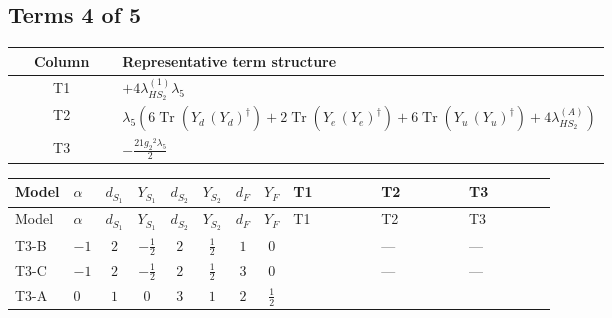 \documentclass[8pt]{article}
\begin{document}
\begin{landscape}
\subsection*{Terms 4 of 5}
\begin{center}
\begin{tabular}{@{}c >{\raggedright\arraybackslash}p{0.82\linewidth}@{}}
\toprule
Column & Representative term structure \\
\midrule
T1 & \(\displaystyle +4 {\lambda_{HS_2}^{(1)}} {\lambda_5}\) \\
\midrule
T2 & \(\displaystyle {\lambda_5} (6 \operatorname{Tr}\!\left({Y_d}\,\left({Y_d}\right)^{\dagger}\right)+2 \operatorname{Tr}\!\left({Y_e}\,\left({Y_e}\right)^{\dagger}\right)+6 \operatorname{Tr}\!\left({Y_u}\,\left({Y_u}\right)^{\dagger}\right)+4 {\lambda_{HS_2}^{(A)}})\) \\
\midrule
T3 & \(\displaystyle -\frac{21 {g_2}^2 {\lambda_5}}{2}\) \\
\midrule
\bottomrule
\end{tabular}
\end{center}
\smallskip
\tiny
\begin{longtable}{@{}llcccccc >{\raggedright\arraybackslash}p{0.21\linewidth} >{\raggedright\arraybackslash}p{0.21\linewidth} >{\raggedright\arraybackslash}p{0.21\linewidth}@{}}
\toprule
Model & $\alpha$ & $d_{S_1}$ & $Y_{S_1}$ & $d_{S_2}$ & $Y_{S_2}$ & $d_F$ & $Y_F$ & T1 & T2 & T3 \\
\midrule
\endfirsthead
\toprule
Model & $\alpha$ & $d_{S_1}$ & $Y_{S_1}$ & $d_{S_2}$ & $Y_{S_2}$ & $d_F$ & $Y_F$ & T1 & T2 & T3 \\
\midrule
\endhead
T3-B & $-1$ & $2$ & $-\frac{1}{2}$ & $2$ & $\frac{1}{2}$ & $1$ & $0$ & \scriptsize\adjustbox{max width=\linewidth}{$\begin{gathered} +4 {\lambda_{HS_2}^{(1)}} {\lambda_5}\end{gathered}$} & --- & --- \\
\midrule
T3-C & $-1$ & $2$ & $-\frac{1}{2}$ & $2$ & $\frac{1}{2}$ & $3$ & $0$ & \scriptsize\adjustbox{max width=\linewidth}{$\begin{gathered} +4 {\lambda_{HS_2}^{(1)}} {\lambda_5}\end{gathered}$} & --- & --- \\
\midrule
T3-A & $0$ & $1$ & $0$ & $3$ & $1$ & $2$ & $\frac{1}{2}$ & \scriptsize\adjustbox{max width=\linewidth}{$\begin{gathered} +4 {\lambda_{HS_2}^{(1)}} {\lambda_5}\end{gathered}$} & \scriptsize\adjustbox{max width=\linewidth}{$\begin{gathered} {\lambda_5} (6 \operatorname{Tr}\!\left({Y_d}\,\left({Y_d}\right)^{\dagger}\right)+2 \operatorname{Tr}\!\left({Y_e}\,\left({Y_e}\right)^{\dagger}\right)+6 \operatorname{Tr}\!\left({Y_u}\,\left({Y_u}\right)^{\dagger}\right)+4 {\lambda_{HS_2}^{(A)}})\end{gathered}$} & \scriptsize\adjustbox{max width=\linewidth}{$\begin{gathered} -\frac{21 {g_2}^2 {\lambda_5}}{2}\end{gathered}$} \\

\end{longtable}
\end{landscape}
\end{document}
